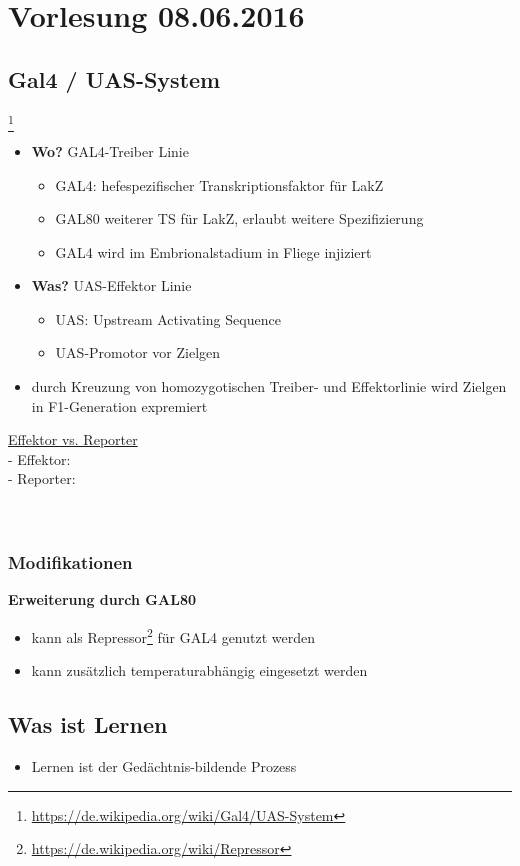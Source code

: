 \section{Vorlesung 08.06.2016}

\subsection{Gal4 / UAS-System}\footnote{\url{https://de.wikipedia.org/wiki/Gal4/UAS-System}}
\begin{itemize}
	\item \textbf{Wo?} GAL4-Treiber Linie
		\begin{itemize}
			\item GAL4: hefespezifischer Transkriptionsfaktor für LakZ
			\item GAL80 weiterer TS für LakZ, erlaubt weitere Spezifizierung
			\item GAL4 wird im Embrionalstadium in Fliege injiziert
		\end{itemize}
	\item \textbf{Was?} UAS-Effektor Linie
		\begin{itemize}
			\item UAS: Upstream Activating Sequence
			\item UAS-Promotor vor Zielgen
		\end{itemize}
	\item durch Kreuzung von homozygotischen Treiber- und Effektorlinie wird Zielgen in F1-Generation expremiert
\end{itemize}

\underline{Effektor vs. Reporter}\\
 - Effektor: \\
 - Reporter: \\
\\\\
\subsubsection{Modifikationen}

\textbf{Erweiterung durch GAL80}
\begin{itemize}
	\item kann als Repressor\footnote{\url{https://de.wikipedia.org/wiki/Repressor}} für GAL4 genutzt werden
	\item kann zusätzlich temperaturabhängig eingesetzt werden
\end{itemize}

\subsection{Was ist Lernen}
\begin{itemize}
	\item Lernen ist der Gedächtnis-bildende Prozess
\end{itemize}

